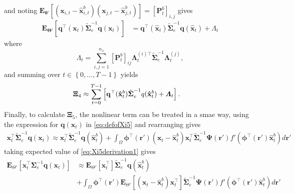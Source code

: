 \documentclass[]{article}
\begin{document}
and noting $\mathbf E_{\boldsymbol\theta'}\left[(\mathbf x_{i,t} - \mathbf  {\hat x}_{i,t}^b)(\mathbf x_{j,t} - \mathbf  {\hat x}_{j,t}^b) \right]=\left[\mathbf{P}_t^b\right]_{i,j} $ gives
\begin{align}
 \mathbf{E}_{\boldsymbol\Theta'}\left[ \mathbf q^\top(\mathbf x_t)\tilde{\boldsymbol\Sigma}_e^{-1}\mathbf q(\mathbf x_t)\right]&= \mathbf q^\top(\mathbf {\hat x}_t)\tilde{\boldsymbol\Sigma}_e^{-1}\mathbf q(\mathbf {\hat x}_t)+\boldsymbol\varLambda_t
\end{align}
where
\begin{equation}
 \boldsymbol\varLambda_t=\sum_{i,j=1}^{n_x}[\mathbf{P}_t^b]_{ij}{\boldsymbol\Lambda}_t^{(i)\top}\tilde{\boldsymbol\Sigma}_e^{-1}{\boldsymbol\Lambda}_t^{(j)},
\end{equation}
and summing over $t \in \left\lbrace 0, \dots, T-1\right\rbrace $ yields
\begin{align}
 \boldsymbol\Xi_{4}&\approx\sum_{t=0}^{T-1}\left[\mathbf q^\top(\mathbf{\hat x}_t^b)\tilde{\boldsymbol\Sigma}_e^{-1}\mathbf \mathbf q(\mathbf{\hat x}_t^b)+\boldsymbol\varLambda_t\right]\label{eq:Xi4Ap}. 
\end{align}
Finally, to calculate $\boldsymbol\Xi_5$, the nonlinear term can be treated in a smae way, using the expression for $\mathbf q(\mathbf x_t)$ in \eqref{eq:defofXi5} and rearranging gives
\begin{align}\label{eq:Xi5derivation1}
 \mathbf x_t^\top\tilde{\boldsymbol\Sigma}_e^{-1}\mathbf q(\mathbf x_t)\approx\mathbf x_t^\top\tilde{\boldsymbol\Sigma}_e^{-1}\mathbf q(\mathbf {\hat x}_t^b)+\int_\Omega \boldsymbol \phi^\top(\mathbf r') (\mathbf x_t - \mathbf  {\hat x}_t^b)\mathbf x_t^\top\tilde{\boldsymbol\Sigma}_e^{-1}\boldsymbol{\Psi}(\mathbf{r}')f'(\boldsymbol \phi^\top(\mathbf r')\mathbf {\hat x}_t^b) d\mathbf{r}'
\end{align}
taking expected value of \eqref{eq:Xi5derivation1} gives
\begin{align}\label{eq:Xi5derivation2}
\mathbf E_{\Theta'}\left[\mathbf x_t^\top\boldsymbol\Sigma_e^{-1}\mathbf q(\mathbf x_t)\right]&\approx\mathbf E_{\Theta'}\left[\mathbf x_t^\top\right]\tilde{\boldsymbol\Sigma}_e^{-1}\mathbf q(\mathbf {\hat x}_t^b)\nonumber \\
&+\int_\Omega \boldsymbol \phi^\top(\mathbf r') \mathbf E_{\Theta'}\left[(\mathbf x_t - \mathbf  {\hat x}_t^b)\mathbf x_t^\top\right]\tilde{\boldsymbol\Sigma}_e^{-1}\boldsymbol{\Psi}(\mathbf{r}')f'(\boldsymbol \phi^\top(\mathbf r')\mathbf {\hat x}_t^b) d\mathbf{r}' 
\end{align}
\end{document}
